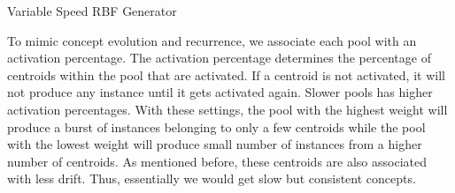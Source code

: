 \begin{algorithm}[htbp]
    \caption{Variable Speed RBF Generator}
    \label{alg:vsrbf}
    \DontPrintSemicolon
      
    
    
\end{algorithm}

To mimic concept evolution and recurrence, we associate each pool with an activation percentage. The activation percentage determines the percentage of centroids within the pool that are activated. If a centroid is not activated, it will not produce any instance until it gets activated again. Slower pools has higher activation percentages. With these settings, the pool with the highest weight will produce a burst of instances belonging to only a few centroids while the pool with the lowest weight will produce small number of instances from a higher number of centroids. As mentioned before, these centroids are also associated with less drift. Thus, essentially we would get slow but consistent concepts.


